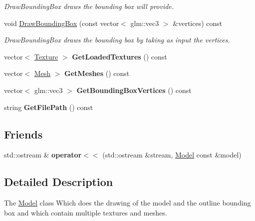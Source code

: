 \begin{DoxyCompactItemize}
\begin{DoxyCompactList}\small\item\em Draw\+Bounding\+Box draws the bounding box will provide. \end{DoxyCompactList}\item 
void \hyperlink{class_model_a2e44a9cc66044f1a0bec5c4590a4225c}{Draw\+Bounding\+Box} (const vector$<$ glm\+::vec3 $>$ \&vertices) const 
\begin{DoxyCompactList}\small\item\em Draw\+Bounding\+Box draws the bounding box by taking as input the vertices. \end{DoxyCompactList}\item 
\hypertarget{class_model_a3de6dceab0188445a152fcdf2fbe0cb9}{}vector$<$ \hyperlink{struct_texture}{Texture} $>$ {\bfseries Get\+Loaded\+Textures} () const \label{class_model_a3de6dceab0188445a152fcdf2fbe0cb9}

\item 
\hypertarget{class_model_adbef7b13fcb41b79702ddf0cddcd1300}{}vector$<$ \hyperlink{class_mesh}{Mesh} $>$ {\bfseries Get\+Meshes} () const \label{class_model_adbef7b13fcb41b79702ddf0cddcd1300}

\item 
\hypertarget{class_model_adb6de1964663b1d59182930047aa95ae}{}vector$<$ glm\+::vec3 $>$ {\bfseries Get\+Bounding\+Box\+Vertices} () const \label{class_model_adb6de1964663b1d59182930047aa95ae}

\item 
\hypertarget{class_model_a18dffdf7f50a87e32c9d8d8eea9a277a}{}string {\bfseries Get\+File\+Path} () const \label{class_model_a18dffdf7f50a87e32c9d8d8eea9a277a}

\end{DoxyCompactItemize}
\subsection*{Friends}
\begin{DoxyCompactItemize}
\item 
\hypertarget{class_model_a12f5c8926b1f1d1e05914778ddd8b901}{}std\+::ostream \& {\bfseries operator$<$$<$} (std\+::ostream \&stream, \hyperlink{class_model}{Model} const \&model)\label{class_model_a12f5c8926b1f1d1e05914778ddd8b901}

\end{DoxyCompactItemize}


\subsection{Detailed Description}
The \hyperlink{class_model}{Model} class Which does the drawing of the model and the outline bounding box and which contain multiple textures and meshes. 

